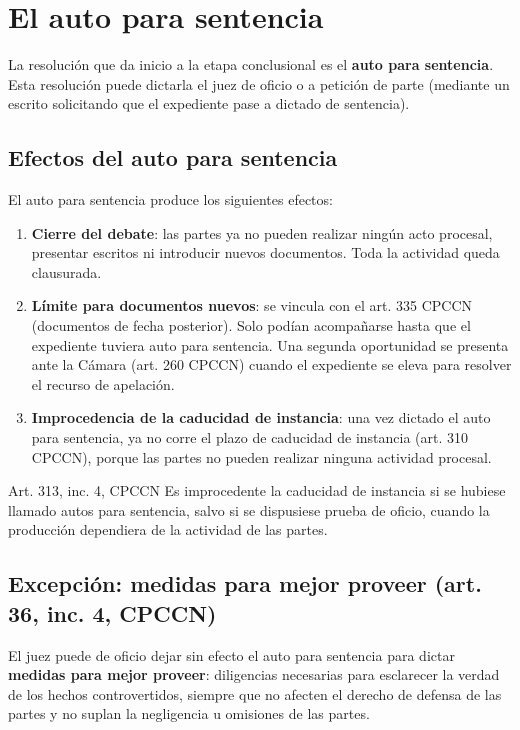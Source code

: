 \documentclass[12pt,oneside]{book}
\begin{document}
\section{El auto para sentencia}

La resolución que da inicio a la etapa conclusional es el \textbf{auto para sentencia}. Esta resolución puede dictarla el juez de oficio o a petición de parte (mediante un escrito solicitando que el expediente pase a dictado de sentencia).

\subsection{Efectos del auto para sentencia}

El auto para sentencia produce los siguientes efectos:

\begin{enumerate}
    \item \textbf{Cierre del debate}: las partes ya no pueden realizar ningún acto procesal, presentar escritos ni introducir nuevos documentos. Toda la actividad queda clausurada.
    \item \textbf{Límite para documentos nuevos}: se vincula con el art. 335 CPCCN (documentos de fecha posterior). Solo podían acompañarse hasta que el expediente tuviera auto para sentencia. Una segunda oportunidad se presenta ante la Cámara (art. 260 CPCCN) cuando el expediente se eleva para resolver el recurso de apelación.
    \item \textbf{Improcedencia de la caducidad de instancia}: una vez dictado el auto para sentencia, ya no corre el plazo de caducidad de instancia (art. 310 CPCCN), porque las partes no pueden realizar ninguna actividad procesal.
\end{enumerate}

\begin{articulo}{Art. 313, inc. 4, CPCCN}
Es improcedente la caducidad de instancia si se hubiese llamado autos para sentencia, salvo si se dispusiese prueba de oficio, cuando la producción dependiera de la actividad de las partes.
\end{articulo}

\subsection{Excepción: medidas para mejor proveer (art. 36, inc. 4, CPCCN)}

El juez puede de oficio dejar sin efecto el auto para sentencia para dictar \textbf{medidas para mejor proveer}: diligencias necesarias para esclarecer la verdad de los hechos controvertidos, siempre que no afecten el derecho de defensa de las partes y no suplan la negligencia u omisiones de las partes.
\end{document}
